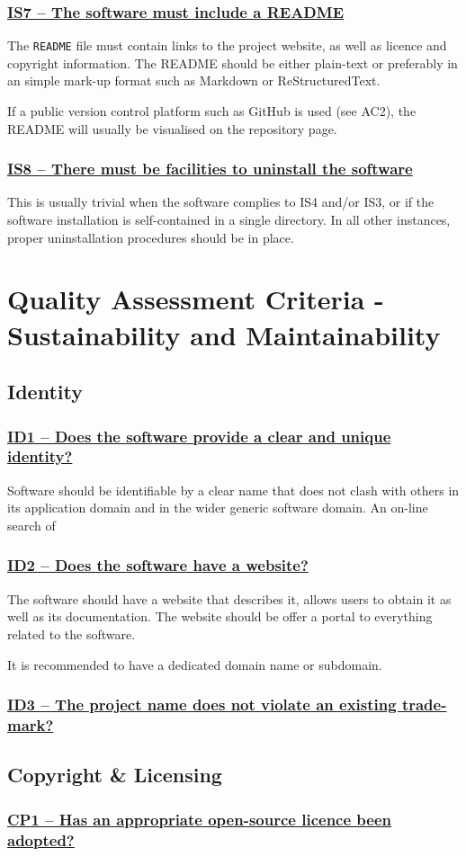 \documentclass[a4paper,11pt]{article}
\newcommand{\criterion}[1]{\subsubsection*{\underline{#1}}}
\begin{document}
\criterion{IS7 -- The software must include a README}

The \texttt{README} file must contain links to the project website, as well as
licence and copyright information. The README should be either plain-text or
preferably in an simple mark-up format such as Markdown or ReStructuredText.

If a public version control platform such as GitHub is used (see AC2), the
README will usually be visualised on the repository page.

\criterion{IS8 -- There must be facilities to uninstall the software}

This is usually trivial when the software complies to IS4 and/or IS3, or if the
software installation is self-contained in a single directory. In all other
instances, proper uninstallation procedures should be in place.


\section{Quality Assessment Criteria - Sustainability and Maintainability}

\subsection{Identity}

\criterion{ID1 -- Does the software provide a clear and unique identity?}

Software should be identifiable by a clear name that does not clash with others
in its application domain and in the wider generic software domain. An on-line
search of 

\criterion{ID2 -- Does the software have a website?}

The software should have a website that describes it, allows users to obtain
it as well as its documentation. The website should be offer a portal to everything
related to the software.

It is recommended to have a dedicated domain name or subdomain.

\criterion{ID3 -- The project name does not violate an existing trade-mark?}

\subsection{Copyright \& Licensing}

\criterion{CP1 -- Has an appropriate open-source licence been adopted?}
\end{document}
